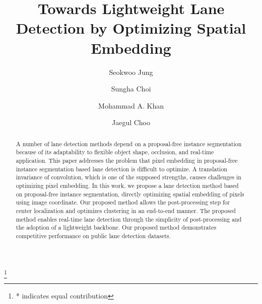 \documentclass[runningheads]{llncs}
\newcommand\blfootnote[1]{\begingroup
  \renewcommand\thefootnote{}\footnote{#1}\addtocounter{footnote}{-1}\endgroup
}
\begin{document}
\pagestyle{headings}
\mainmatter
\def\ECCVSubNumber{100}  

\title{Towards Lightweight Lane Detection by Optimizing Spatial Embedding} 

\begin{comment}
\titlerunning{ECCV-20 submission ID \ECCVSubNumber} 
\authorrunning{ECCV-20 submission ID \ECCVSubNumber} 
\author{Anonymous ECCV submission}
\institute{Paper ID \ECCVSubNumber}
\end{comment}


\author{Seokwoo Jung \and
Sungha Choi \and
Mohammad A. Khan \and
Jaegul Choo}
\maketitle
\blfootnote{\vspace*{-0.3cm}* indicates equal contribution}

\begin{abstract}
\vspace*{-1.0cm}
A number of lane detection methods depend on a proposal-free instance segmentation because of its adaptability to flexible object shape, occlusion, and real-time application. This paper addresses the problem that pixel embedding in proposal-free instance segmentation based lane detection is difficult to optimize. A translation invariance of convolution, which is one of the supposed strengths, causes challenges in optimizing pixel embedding. In this work, we propose a lane detection method based on proposal-free instance segmentation, directly optimizing spatial embedding of pixels using image coordinate. Our proposed method allows the post-processing step for center localization and optimizes clustering in an end-to-end manner. The proposed method enables real-time lane detection through the simplicity of post-processing and the adoption of a lightweight backbone. Our proposed method demonstrates competitive performance on public lane detection datasets.
\vspace*{-0.3cm}
\end{abstract}
\end{document}
